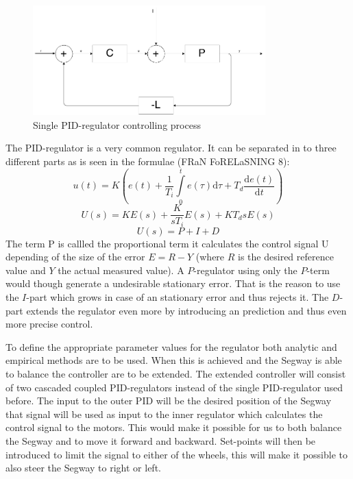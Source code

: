 \begin{figure}[h]
    \label{1}
    \centering
    \includegraphics[width=0.8\textwidth]{process_one_regul.png}
    \caption{Single PID-regulator controlling process}
\end{figure}
The PID-regulator is a very common regulator. It can be separated in to three different parts as is seen in the formulae (FRaN FoRELaSNING 8):
\begin{equation}
   u(t) = K(e(t) + \frac{1}{T_i}\int\limits_0^t e(\tau) \mathrm{d}\tau + T_d\frac{\mathrm d e(t)}{\mathrm d t})
\end{equation}
\begin{equation}
   U(s) = KE(s) +  \frac{K}{sT_i}E(s) + KT_d s E(s)
\end{equation}
\begin{equation}
   U(s) = P +  I + D
\end{equation}
The term P is callled the proportional term it calculates the control signal U depending of the size of the error $E = R - Y$ (where $R$ is the desired reference value and $Y$ the actual measured value). A $P$-regulator using only the $P$-term would though generate a undesirable stationary error. That is the reason to use the $I$-part which grows in case of an stationary error and thus rejects it. The $D$-part extends the regulator even more by introducing an prediction and thus even more precise control.

To define the appropriate parameter values for the regulator both analytic and empirical methods are to be used.
 When this is achieved and the Segway is able to balance the controller are to be extended. The extended controller will consist of  two cascaded coupled PID-regulators instead of the single PID-regulator used before. The input to the outer PID will be the desired position of the Segway that signal will be used as input to the inner regulator which calculates the control signal to the motors. This would make it possible for us to both balance the Segway and to move it forward and backward. Set-points will then be introduced to limit the signal to either of the wheels, this will make it possible to also steer the Segway to right or left.



